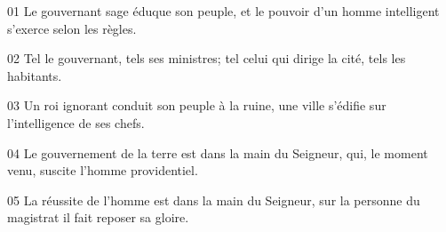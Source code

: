 01 Le gouvernant sage éduque son peuple, et le pouvoir d’un homme intelligent s’exerce selon les règles.

02 Tel le gouvernant, tels ses ministres; tel celui qui dirige la cité, tels les habitants.

03 Un roi ignorant conduit son peuple à la ruine, une ville s’édifie sur l’intelligence de ses chefs.

04 Le gouvernement de la terre est dans la main du Seigneur, qui, le moment venu, suscite l’homme providentiel.

05 La réussite de l’homme est dans la main du Seigneur, sur la personne du magistrat il fait reposer sa gloire.

